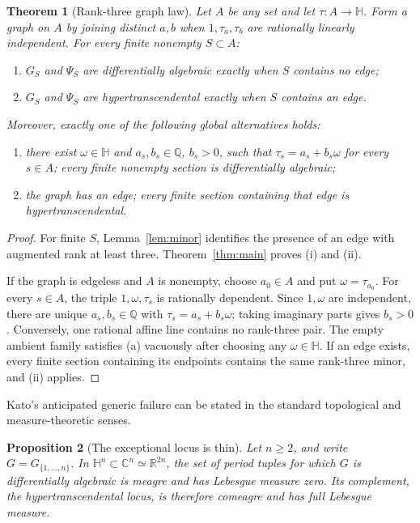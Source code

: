 \documentclass[11pt]{article}
\numberwithin{equation}{section}
\newtheorem{theorem}{Theorem}[section]
\newtheorem{proposition}[theorem]{Proposition}
\theoremstyle{definition}
\theoremstyle{remark}
\newcommand{\C}{\mathbb C}
\newcommand{\Q}{\mathbb Q}
\newcommand{\R}{\mathbb R}
\newcommand{\HH}{\mathbb H}
\begin{document}
\begin{theorem}[Rank-three graph law]
\label{thm:graph}
Let $A$ be any set and let $\tau:A\to\HH$.  Form a graph on $A$ by joining
distinct $a,b$ when $1,\tau_a,\tau_b$ are rationally linearly independent.
For every finite nonempty $S\subset A$:
\begin{enumerate}[label=\textup{(\roman*)}]
\item $G_S$ and $\Psi_S$ are differentially algebraic exactly when $S$
contains no edge;
\item $G_S$ and $\Psi_S$ are hypertranscendental exactly when $S$ contains
an edge.
\end{enumerate}
Moreover, exactly one of the following global alternatives holds:
\begin{enumerate}[label=\textup{(\alph*)}]
\item there exist $\omega\in\HH$ and $a_s,b_s\in\Q$, $b_s>0$, such that
$\tau_s=a_s+b_s\omega$ for every $s\in A$; every finite nonempty section is
differentially algebraic;
\item the graph has an edge; every finite section containing that edge is
hypertranscendental.
\end{enumerate}
\end{theorem}

\begin{proof}
For finite $S$, Lemma~\ref{lem:minor} identifies the presence of an edge
with augmented rank at least three.  Theorem~\ref{thm:main} proves (i) and
(ii).

If the graph is edgeless and $A$ is nonempty, choose $a_0\in A$ and put
$\omega=\tau_{a_0}$.  For every $s\in A$, the triple
$1,\omega,\tau_s$ is rationally dependent.  Since $1,\omega$ are
independent, there are unique $a_s,b_s\in\Q$ with
$\tau_s=a_s+b_s\omega$; taking imaginary parts gives $b_s>0$.  Conversely,
one rational affine line contains no rank-three pair.  The empty ambient
family satisfies (a) vacuously after choosing any $\omega\in\HH$.  If an
edge exists, every finite section containing its endpoints contains the same
rank-three minor, and (ii) applies.
\end{proof}

Kato's anticipated generic failure can be stated in the standard topological
and measure-theoretic senses.

\begin{proposition}[The exceptional locus is thin]
\label{prop:generic}
Let $n\geq2$, and write $G=G_{\{1,\ldots,n\}}$.  In
$\HH^n\subset\C^n\simeq\R^{2n}$, the set of period tuples for which $G$ is
differentially algebraic is meagre and has Lebesgue measure zero.  Its
complement, the hypertranscendental locus, is therefore comeagre and has full
Lebesgue measure.
\end{proposition}
\end{document}
